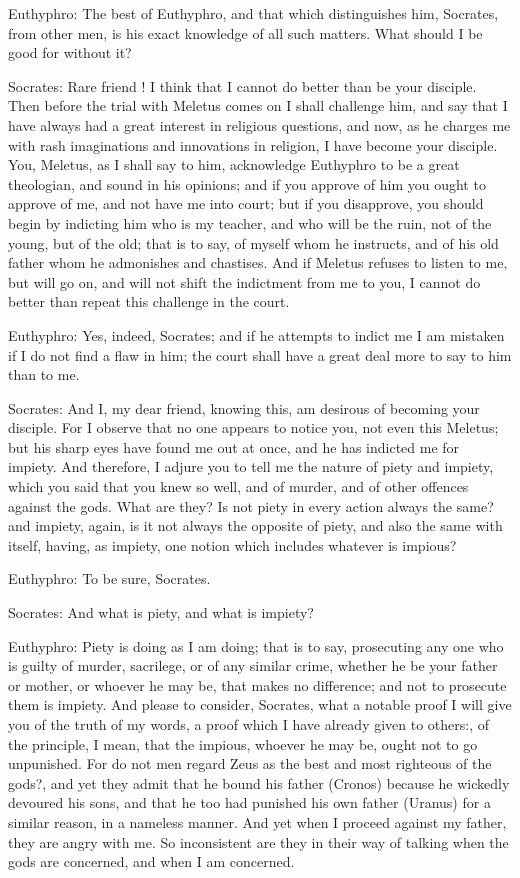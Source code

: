 Euthyphro: The best of Euthyphro, and that which distinguishes him, Socrates, from other men, is his exact knowledge of all such matters. What should I be good for without it?

Socrates: Rare friend ! I think that I cannot do better than be your disciple. Then before the trial with Meletus comes on I shall challenge him, and say that I have always had a great interest in religious questions, and now, as he charges me with rash imaginations and innovations in religion, I have become your disciple. You, Meletus, as I shall say to him, acknowledge Euthyphro to be a great theologian, and sound in his opinions; and if you approve of him you ought to approve of me, and not have me into court; but if you disapprove, you should begin by indicting him who is my teacher, and who will be the ruin, not of the young, but of the old; that is to say, of myself whom he instructs, and of his old father whom he admonishes and chastises. And if Meletus refuses to listen to me, but will go on, and will not shift the indictment from me to you, I cannot do better than repeat this challenge in the court.

Euthyphro: Yes, indeed, Socrates; and if he attempts to indict me I am mistaken if I do not find a flaw in him; the court shall have a great deal more to say to him than to me.

Socrates: And I, my dear friend, knowing this, am desirous of becoming your disciple. For I observe that no one appears to notice you,  not even this Meletus; but his sharp eyes have found me out at once, and he has indicted me for impiety. And therefore, I adjure you to tell me the nature of piety and impiety, which you said that you knew so well, and of murder, and of other offences against the gods. What are they? Is not piety in every action always the same? and impiety, again,  is it not always the opposite of piety, and also the same with itself, having, as impiety, one notion which includes whatever is impious?

Euthyphro: To be sure, Socrates.

Socrates: And what is piety, and what is impiety?

Euthyphro: Piety is doing as I am doing; that is to say, prosecuting any one who is guilty of murder, sacrilege, or of any similar crime, whether he be your father or mother, or whoever he may be, that makes no difference; and not to prosecute them is impiety. And please to consider, Socrates, what a notable proof I will give you of the truth of my words, a proof which I have already given to others:, of the principle, I mean, that the impious, whoever he may be, ought not to go unpunished. For do not men regard Zeus as the best and most righteous of the gods?, and yet they admit that he bound his father (Cronos) because he wickedly devoured his sons, and that he too had punished his own father (Uranus) for a similar reason, in a nameless manner. And yet when I proceed against my father, they are angry with me. So inconsistent are they in their way of talking when the gods are concerned, and when I am concerned.

